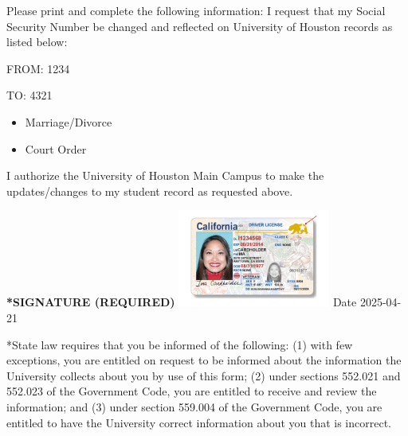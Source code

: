 \documentclass[12pt]{article}
\newcommand{\CheckedBox}[1]{%
  \ifthenelse{\equal{#1}{yes}}{$\boxtimes$}{$\square$}%
}
\begin{document}
\vspace{1em}
\noindent Please print and complete the following information: I request that my Social Security Number be changed and reflected on University of Houston records as listed below:

\vspace{0.5em}
\noindent FROM: 1234

\vspace{0.5em}
\noindent TO: 4321

\vspace{0.5em}
\begin{itemize}[leftmargin=0.7cm]
	\item \CheckedBox{no} Marriage/Divorce
	\item \CheckedBox{yes} Court Order
\end{itemize}

\vspace{1em}
\noindent I authorize the University of Houston Main Campus to make the updates/changes to my student record as requested above.

\vspace{1em}
\noindent\textbf{*SIGNATURE (REQUIRED)} \includegraphics[width=5cm]{static/uploads/signatures/f5f99f3e-430c-416d-a2a7-d2868574a028.jpg} Date 2025-04-21

\vspace{1em}
\footnotesize{*State law requires that you be informed of the following: (1) with few exceptions, you are entitled on request to be informed about the information the University collects about you by use of this form; (2) under sections 552.021 and 552.023 of the Government Code, you are entitled to receive and review the information; and (3) under section 559.004 of the Government Code, you are entitled to have the University correct information about you that is incorrect.}
\end{document}
